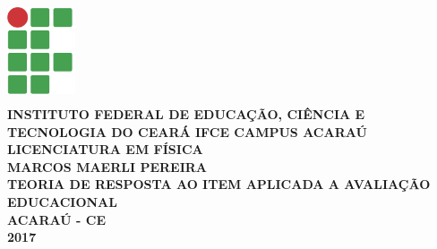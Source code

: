 \pagestyle{empty}
\begin{titlepage}
	\begin{center}
		\includegraphics[width=2cm,height=3cm]{img/if}\\
		\textbf{INSTITUTO FEDERAL DE EDUCAÇÃO, CIÊNCIA E TECNOLOGIA DO CEARÁ IFCE CAMPUS ACARAÚ}
		\textbf{LICENCIATURA EM FÍSICA}\\
		\vspace{3cm}
		\textbf{MARCOS MAERLI PEREIRA}\\
				\vspace{4cm}
				\textbf{TEORIA DE RESPOSTA AO ITEM APLICADA A AVALIAÇÃO EDUCACIONAL}\\
				\vspace{6cm}
				\textbf{ACARAÚ - CE\\2017}
		\end{center}
	\end{titlepage}
\newpage
